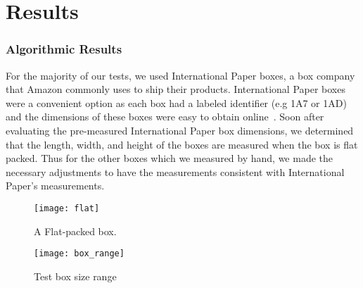 \documentclass[11pt, twoside, reqno]{book}
\begin{document}
\chapter{Results}
\label{label}

\subsection{Algorithmic Results}
	For the majority of our tests, we used International Paper boxes, a box company that Amazon commonly uses to ship their products. International Paper boxes were a convenient option as each box had a labeled identifier (e.g 1A7 or 1AD) and the dimensions of these boxes were easy to obtain online~\cite{intpaper}. Soon after evaluating the pre-measured International Paper box dimensions, we determined that the length, width, and height of the boxes are measured when the box is flat packed. Thus for the other boxes which we measured by hand, we made the necessary adjustments to have the measurements consistent with International Paper's measurements. 

\begin{figure} [H]
	\begin{center}
		\graphicspath{ {images/} }
		
		\texttt{[image: flat]}
		\caption{A Flat-packed box.~\cite{intpaper}} 
		
	\end{center}
	
	
\end{figure}





\begin{figure} [H]
	\graphicspath{ {images/} }
	\texttt{[image: box\_range]}
	\caption{Test box size range \cite{intpaper}}

\end{figure}
\end{document}
